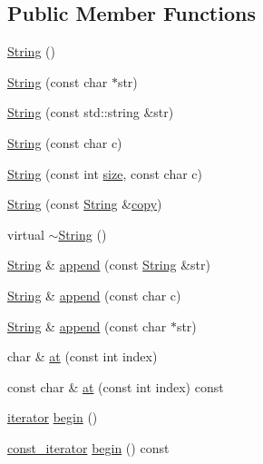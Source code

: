 \subsection*{Public Member Functions}
\begin{DoxyCompactItemize}
\item 
\hyperlink{classprism_1_1_string_a3a9df9dd5d297b91d2eec1ef7c4db8d3}{String} ()
\item 
\hyperlink{classprism_1_1_string_ad273f297c9125493c40876e368347fbf}{String} (const char $\ast$str)
\item 
\hyperlink{classprism_1_1_string_aedf9c8008bc992012ed8dea7b312683c}{String} (const std\+::string \&str)
\item 
\hyperlink{classprism_1_1_string_aa60f6e3b928d3072c204deba612dec65}{String} (const char c)
\item 
\hyperlink{classprism_1_1_string_ac14b5c78edff344d549496eba0b226c5}{String} (const int \hyperlink{classprism_1_1_string_a603b5a90681d43adf7c6c29018e0300c}{size}, const char c)
\item 
\hyperlink{classprism_1_1_string_a6734cae1e3f2165a4a5d1f48cb56d0fe}{String} (const \hyperlink{classprism_1_1_string}{String} \&\hyperlink{namespaceprism_ae776f4cd825f79e7af1cf6ee1d90a209}{copy})
\item 
virtual \hyperlink{classprism_1_1_string_ab0114c8ba868b0facea3286d2764f010}{$\sim$\+String} ()
\item 
\hyperlink{classprism_1_1_string}{String} \& \hyperlink{classprism_1_1_string_af3c09c0f82ab5d85c78da4735f80fd6a}{append} (const \hyperlink{classprism_1_1_string}{String} \&str)
\item 
\hyperlink{classprism_1_1_string}{String} \& \hyperlink{classprism_1_1_string_abd1d707fe07b1e9565b77cf86b2fa5f5}{append} (const char c)
\item 
\hyperlink{classprism_1_1_string}{String} \& \hyperlink{classprism_1_1_string_a730e94334cafe06fb1e7f6c608bd1677}{append} (const char $\ast$str)
\item 
char \& \hyperlink{classprism_1_1_string_a2bbac16806974edd5c6d0d1d19ac7d5a}{at} (const int index)
\item 
const char \& \hyperlink{classprism_1_1_string_a55e86af07823ab80c1b6b0849231312b}{at} (const int index) const 
\item 
\hyperlink{classprism_1_1_string_adacc7975837e5fff95d70690777fb330}{iterator} \hyperlink{classprism_1_1_string_ae8f176fbe590422a3061552b8ed36ec5}{begin} ()
\item 
\hyperlink{classprism_1_1_string_a8b46f0fbe9c5c94ba892975242e3ab68}{const\+\_\+iterator} \hyperlink{classprism_1_1_string_ab3b18cfb5a3de6481f2f3d82bf5f0ef6}{begin} () const 

\end{DoxyCompactItemize}
